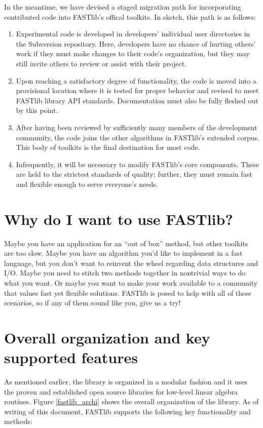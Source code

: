 \documentclass[letter]{report}
\begin{document}
In the meantime, we have devised a staged migration path for
incorporating contributed code into FASTlib's offical toolkits.  In
sketch, this path is as follows:
\begin{enumerate}
\item Experimental code is developed in developers' individual user
  directories in the Subversion repository.  Here, developers have no
  chance of hurting others' work if they must make changes to their
  code's organization, but they may still invite others to review or
  assist with their project.
\item Upon reaching a satisfactory degree of functionality, the code
  is moved into a provisional location where it is tested for proper
  behavior and revised to meet FASTlib library API standards.
  Documentation must also be fully fleshed out by this point.
\item After having been reviewed by sufficiently many members of the
  development community, the code joins the other algorithms in
  FASTlib's extended corpus.  This body of toolkits is the final
  destination for most code.
\item Infrequently, it will be necessary to modify FASTlib's core
  components.  These are held to the strictest standards of quality;
  further, they must remain fast and flexible enough to serve
  everyone's needs.
\end{enumerate}

\section{Why do I want to use FASTlib?} 
Maybe you have an application for an ``out of box'' method, but other
toolkits are too slow.  Maybe you have an algorithm you'd like to
implement in a fast language, but you don't want to reinvent the wheel
regarding data structures and I/O.  Maybe you need to stitch two
methods together in nontrivial ways to do what you want.  Or maybe you
want to make your work available to a community that values fast yet
flexible solutions.  FASTlib is posed to help with all of these
scenarios, so if any of them sound like you, give us a try!

\section{Overall organization and key supported features}

As mentioned earlier, the library is organized in a modular fashion and it uses the proven and established open source libraries for low-level linear algebra routines. Figure \ref{fastlib_archi} shows the overall organization of the library. As of writing of this document, FASTlib supports the following key functionality and methods:
\end{document}
